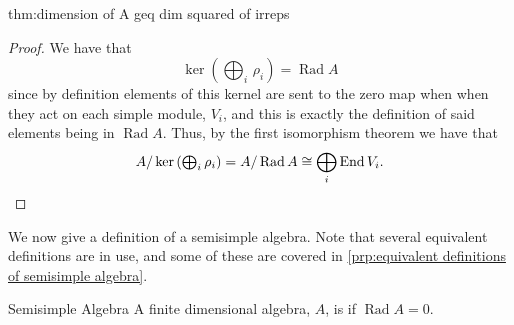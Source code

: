 \documentclass[fleqn]{NotesClass}
\DeclareMathOperator{\End}{End}
\newcommand{\isomorphic}{\cong}
\DeclareMathOperator{\Rad}{Rad}
\begin{document}
\begin{thm}{}{thm:dimension of A geq dim squared of irreps}
\begin{proof}
            We have that
            \begin{equation}
                \ker\left( {\textstyle \bigoplus_i} \, \rho_i \right) = \Rad A
            \end{equation}
            since by definition elements of this kernel are sent to the zero map when when they act on each simple module, \(V_i\), and this is exactly the definition of said elements being in \(\Rad A\).
            Thus, by the first isomorphism theorem we have that
            \begin{equation*}
                A/\ker\left( {\textstyle \bigoplus_i} \, \rho_i \right) = A/\Rad A \isomorphic \bigoplus_i \End V_i. \qedhere
            \end{equation*}
        \end{proof}
    \end{thm}
    
    We now give a definition of a semisimple algebra.
    Note that several equivalent definitions are in use, and some of these are covered in \cref{prp:equivalent definitions of semisimple algebra}.
    
    \begin{dfn}{Semisimple Algebra}{}
        A finite dimensional algebra, \(A\), is  if \(\Rad A = 0\).
    \end{dfn}
    
\end{document}
